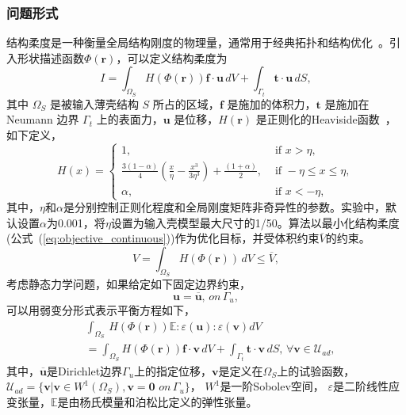 \subsubsection{问题形式}
结构柔度是一种衡量全局结构刚度的物理量，通常用于经典拓扑和结构优化~\cite{Bendsoe1989,Wang2003}。引入形状描述函数$\Phi(\textbf{r})$，可以定义结构柔度为
\begin{equation}
    \label{eq:objective_continuous}
        I=\int_{\Omega_S}H(\Phi(\textbf{r})) \textbf{f} \cdot \textbf{u}\, dV+\int_{\Gamma_t} \textbf{t}\cdot \textbf{u}\, dS,
\end{equation}
其中 $\Omega_S$ 是被输入薄壳结构 $S$ 所占的区域，$ \textbf{f}$ 是施加的体积力，$\textbf{t}$ 是施加在 Neumann 边界 $\Gamma_t$ 上的表面力，$\textbf{u}$ 是位移，$H(\textbf{r})$ 是正则化的Heaviside函数~\cite{Guo2016}，如下定义， 
\begin{equation}
    H(x)=
    \begin{cases}1 ,\,\,&\textrm{if}\,\,  x>\eta, \\
    \frac{3(1-\alpha)}{4}(\frac{x}{\eta}-\frac{x^3}{3\eta^3})+\frac{(1+\alpha)}{2}, \,\,&\textrm{if}\,\,  -\eta\leq x\leq\eta, \\
     \alpha,\,\,&\textrm{if}\,\,  x<-\eta,
     \end{cases}
\end{equation}
其中，$\eta$和$\alpha$是分别控制正则化程度和全局刚度矩阵非奇异性的参数。实验中，默认设置$\alpha$为0.001，将$\eta$设置为输入壳模型最大尺寸的1/50。算法以最小化结构柔度(公式~(\ref{eq:objective_continuous}))作为优化目标，并受体积约束$\overline{V}$的约束。
\begin{equation}
    V=\int_{\Omega_S}H(\Phi(\textbf{r}))\,dV\leq\overline{V}, 
\end{equation}
考虑静态力学问题，如果给定如下固定边界约束，
\begin{equation}
    \textbf{u}=\overline{\textbf{u}},\,on \, \Gamma_u,
\end{equation}
可以用弱变分形式表示平衡方程如下，
\begin{align}
    \label{eq:equilibrium}
    &\int_{\Omega_S}\,H(\Phi(\textbf{r}))\mathbb{E}: \varepsilon(\textbf{u}):\varepsilon(\textbf{v}) dV \nonumber \\
    &=\int_{\Omega_S}H(\Phi(\textbf{r})) \textbf{f}\cdot \textbf{v}\, dV+\int_{\Gamma_t} \textbf{t}\cdot \textbf{v} \, dS,\,\forall \textbf{v} \in\mathcal{U}_{ad},
\end{align}
其中，$\overline{\textbf{u}}$是Dirichlet边界$\Gamma_u$上的指定位移，$\textbf{v}$是定义在$\Omega_S$上的试验函数，
$\mathcal{U}_{ad}=\{ \textbf{v}| \textbf{v} \in W^1( \Omega_S ), \textbf{v} =\textbf{0}\,\, on\, \Gamma_u\}$，
$W^1$是一阶Sobolev空间，
$\varepsilon$是二阶线性应变张量，$\mathbb{E}$是由杨氏模量和泊松比定义的弹性张量。

